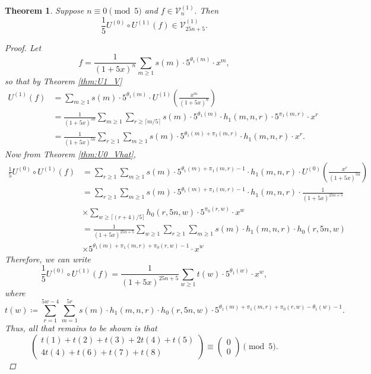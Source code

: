 \documentclass[12pt, reqno]{amsart}
\newtheorem{thm}{Theorem}[section]
\theoremstyle{definition}
\theoremstyle{remark}
\begin{document}
\begin{thm}\label{thm:stab}
Suppose $n \equiv 0 \pmod{5}$ and $f \in \mathcal{V}_n^{(1)}.$ Then 
\[\frac{1}{5} U^{(0)} \circ U^{(1)} (f) \in \mathcal{V}_{25n+5}^{(1)}.\]
\begin{proof}
Let
\[f = \frac{1}{(1+5x)^n} \sum\limits_{m \geq 1} s(m) \cdot 5^{\theta_1(m)} \cdot x^m,\]
so that by Theorem \ref{thm:U1_V}
\begin{align*} 
U^{(1)}(f) &= \sum\limits_{m \geq 1} s(m) \cdot 5^{\theta_1(m)} \cdot U^{(1)}\left(\frac{x^m}{(1+5x)^n}\right) \\
&= \frac{1}{(1+5x)^{5n}} \sum\limits_{m \geq 1}    \sum\limits_{r \geq \lceil m/5 \rceil} s(m) \cdot 5^{\theta_1(m)} \cdot h_1(m,n,r) \cdot 5^{\pi_1(m,r)} \cdot x^r \\
&=  \frac{1}{(1+5x)^{5n}} \sum\limits_{r \geq 1}    \sum\limits_{m \geq 1} s(m) \cdot 5^{\theta_1(m)+\pi_1(m,r)} \cdot h_1(m,n,r) \cdot x^r.
\end{align*}
Now from Theorem \ref{thm:U0_Vhat},
\begin{align*}
\frac{1}{5} U^{(0)} \circ U^{(1)} (f) &= \sum\limits_{r \geq 1} \sum\limits_{m \geq 1} s(m) \cdot 5^{\theta_1(m)+\pi_1(m,r)-1} \cdot h_1(m,n,r) \cdot U^{(0)} \left(\frac{x^r}{(1+5x)^{5n}}\right) \\ 
&=\sum\limits_{r \geq 1} \sum\limits_{m \geq 1} s(m) \cdot 5^{\theta_1(m)+\pi_1(m,r)-1} \cdot h_1(m,n,r) \cdot \frac{1}{(1+5x)^{25n+5}} \\
&\times \sum\limits_{w \geq \lceil (r+4)/5 \rceil} h_0(r,5n,w) \cdot 5^{\pi_0(r,w)} \cdot x^w \\
&= \frac{1}{(1+5x)^{25n+5}} \sum\limits_{w \geq 1} \sum\limits_{r \geq 1} \sum\limits_{m \geq 1} s(m) \cdot h_1(m,n,r) \cdot h_0(r,5n,w) \\
&\times 5^{\theta_1(m) + \pi_1(m,r) + \pi_0(r,w) -1} \cdot x^w
\end{align*}
Therefore, we can write
\begin{equation}
\frac{1}{5} U^{(0)} \circ U^{(1)} (f) = \frac{1}{(1+5x)^{25n+5}} \sum\limits_{w \geq 1} t(w) \cdot 5^{\theta_1(w)} \cdot x^w,
\end{equation}
where
\[t(w) \coloneqq \sum\limits_{r=1}^{5w-4} \sum\limits_{m=1}^{5r} s(m) \cdot h_1(m,n,r) \cdot h_0(r,5n,w) \cdot 5^{\theta_1(m) + \pi_1(m,r) + \pi_0(r,w) -\theta_1(w) -1}.\]
Thus, all that remains to be shown is that 
\begin{equation}\label{eq:t_congs}
\begin{pmatrix} t(1) + t(2) + t(3) + 2t(4) + t(5) \\ 4t(4) + t(6) + t(7) + t(8) \end{pmatrix} \equiv \begin{pmatrix} 0 \\ 0 \end{pmatrix} \pmod{5}.

\end{equation}
\end{proof}
\end{thm}
\end{document}
